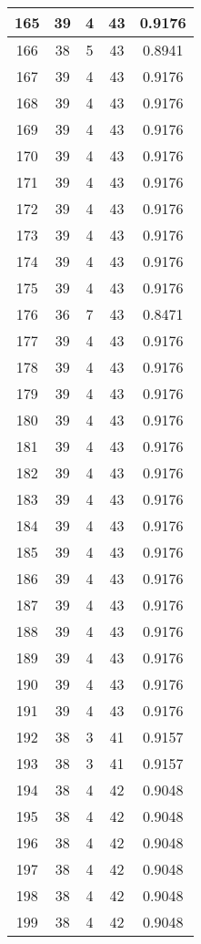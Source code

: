 \documentclass[letterpaper, 12pt]{article}
\begin{document}
\begin{longtable}{|c|c|c|c|c|}
165 & 39 & 4 & 43 & 0.9176 \\
\hline
166 & 38 & 5 & 43 & 0.8941 \\
\hline
167 & 39 & 4 & 43 & 0.9176 \\
\hline
168 & 39 & 4 & 43 & 0.9176 \\
\hline
169 & 39 & 4 & 43 & 0.9176 \\
\hline
170 & 39 & 4 & 43 & 0.9176 \\
\hline
171 & 39 & 4 & 43 & 0.9176 \\
\hline
172 & 39 & 4 & 43 & 0.9176 \\
\hline
173 & 39 & 4 & 43 & 0.9176 \\
\hline
174 & 39 & 4 & 43 & 0.9176 \\
\hline
175 & 39 & 4 & 43 & 0.9176 \\
\hline
176 & 36 & 7 & 43 & 0.8471 \\
\hline
177 & 39 & 4 & 43 & 0.9176 \\
\hline
178 & 39 & 4 & 43 & 0.9176 \\
\hline
179 & 39 & 4 & 43 & 0.9176 \\
\hline
180 & 39 & 4 & 43 & 0.9176 \\
\hline
181 & 39 & 4 & 43 & 0.9176 \\
\hline
182 & 39 & 4 & 43 & 0.9176 \\
\hline
183 & 39 & 4 & 43 & 0.9176 \\
\hline
184 & 39 & 4 & 43 & 0.9176 \\
\hline
185 & 39 & 4 & 43 & 0.9176 \\
\hline
186 & 39 & 4 & 43 & 0.9176 \\
\hline
187 & 39 & 4 & 43 & 0.9176 \\
\hline
188 & 39 & 4 & 43 & 0.9176 \\
\hline
189 & 39 & 4 & 43 & 0.9176 \\
\hline
190 & 39 & 4 & 43 & 0.9176 \\
\hline
191 & 39 & 4 & 43 & 0.9176 \\
\hline
192 & 38 & 3 & 41 & 0.9157 \\
\hline
193 & 38 & 3 & 41 & 0.9157 \\
\hline
194 & 38 & 4 & 42 & 0.9048 \\
\hline
195 & 38 & 4 & 42 & 0.9048 \\
\hline
196 & 38 & 4 & 42 & 0.9048 \\
\hline
197 & 38 & 4 & 42 & 0.9048 \\
\hline
198 & 38 & 4 & 42 & 0.9048 \\
\hline
199 & 38 & 4 & 42 & 0.9048 \\
\hline
\end{longtable}
\end{document}
